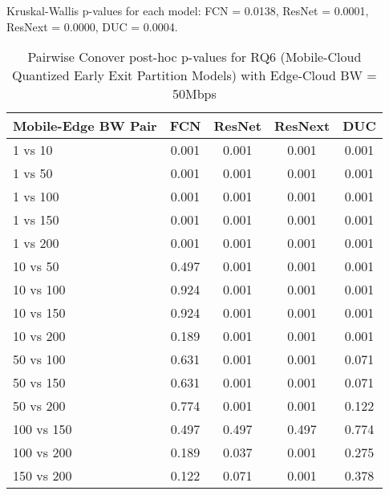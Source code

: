 \begin{table}[h]
\centering
\caption{Pairwise Conover post-hoc p-values for RQ6 (Mobile-Cloud Quantized Early Exit Partition Models) with Edge-Cloud BW = 50Mbps}
\label{tab:conover_mobile_cloud_quantized_earlyexit_partition_ec50}
\smallskip
Kruskal-Wallis p-values for each model: FCN = 0.0138, ResNet = 0.0001, ResNext = 0.0000, DUC = 0.0004.

\begin{tabular}{lcccc}
\toprule
Mobile-Edge BW Pair & FCN & ResNet & ResNext & DUC \\
\midrule
1 vs 10 & 0.001 & 0.001 & 0.001 & 0.001 \\
1 vs 50 & 0.001 & 0.001 & 0.001 & 0.001 \\
1 vs 100 & 0.001 & 0.001 & 0.001 & 0.001 \\
1 vs 150 & 0.001 & 0.001 & 0.001 & 0.001 \\
1 vs 200 & 0.001 & 0.001 & 0.001 & 0.001 \\
10 vs 50 & 0.497 & 0.001 & 0.001 & 0.001 \\
10 vs 100 & 0.924 & 0.001 & 0.001 & 0.001 \\
10 vs 150 & 0.924 & 0.001 & 0.001 & 0.001 \\
10 vs 200 & 0.189 & 0.001 & 0.001 & 0.001 \\
50 vs 100 & 0.631 & 0.001 & 0.001 & 0.071 \\
50 vs 150 & 0.631 & 0.001 & 0.001 & 0.071 \\
50 vs 200 & 0.774 & 0.001 & 0.001 & 0.122 \\
100 vs 150 & 0.497 & 0.497 & 0.497 & 0.774 \\
100 vs 200 & 0.189 & 0.037 & 0.001 & 0.275 \\
150 vs 200 & 0.122 & 0.071 & 0.001 & 0.378 \\
\bottomrule
\end{tabular}
\end{table}


